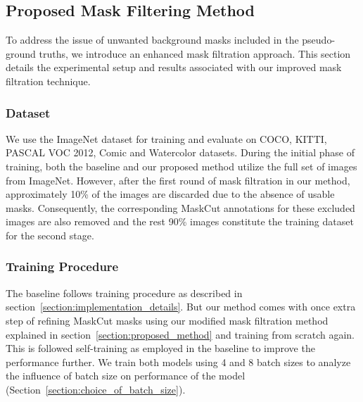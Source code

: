 \subsection{Proposed Mask Filtering Method}
\label{section:mask_refinement_experiment}
To address the issue of unwanted background masks included in the pseudo-ground truths, we introduce an enhanced mask filtration approach. This section details the experimental setup and results associated with our improved mask filtration technique.

\subsubsection{Dataset}
We use the ImageNet dataset for training and evaluate on COCO, KITTI, PASCAL VOC 2012, Comic and Watercolor datasets. During the initial phase of training, both the baseline and our proposed method utilize the full set of images from ImageNet. However, after the first round of mask filtration in our method, approximately 10\% of the images are discarded due to the absence of usable masks. Consequently, the corresponding MaskCut annotations for these excluded images are also removed and the rest 90\% images constitute the training dataset for the second stage.

\subsubsection{Training Procedure}
The baseline follows training procedure as described in section~\ref{section:implementation_details}. But our method comes with once extra step of refining MaskCut masks using our modified mask filtration method explained in section~\ref{section:proposed_method} and training from scratch again. This is followed self-training as employed in the baseline to improve the performance further. We train both models using 4 and 8 batch sizes to analyze the influence of batch size on performance of the model (Section~\ref{section:choice_of_batch_size}). 

